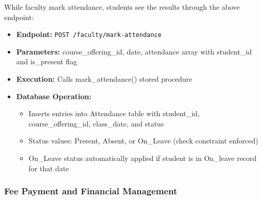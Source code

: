 \documentclass[12pt]{article}
\begin{document}
While faculty mark attendance, students see the results through the above endpoint:
\begin{itemize}
    \item \textbf{Endpoint:} \texttt{POST /faculty/mark-attendance}
    \item \textbf{Parameters:} course\_offering\_id, date, attendance array with student\_id and is\_present flag
    \item \textbf{Execution:} Calls mark\_attendance() stored procedure
    \item \textbf{Database Operation:}
        \begin{itemize}
            \item Inserts entries into Attendance table with student\_id, course\_offering\_id, class\_date, and status
            \item Status values: Present, Absent, or On\_Leave (check constraint enforced)
            \item On\_Leave status automatically applied if student is in On\_leave record for that date
        \end{itemize}
\end{itemize}

\subsubsection{Fee Payment and Financial Management}
\end{document}
